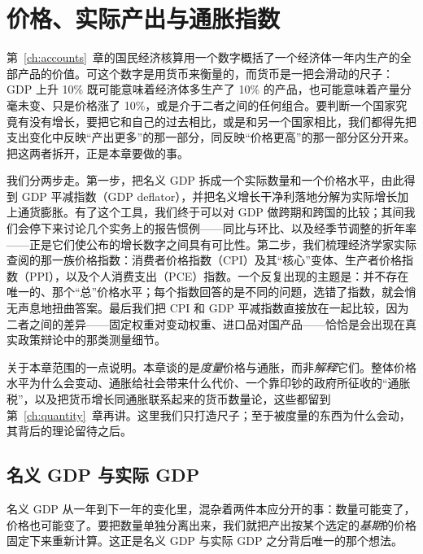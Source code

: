 \chapter{价格、实际产出与通胀指数}
\label{ch:prices}

第~\ref{ch:accounts}~章的国民经济核算用一个数字概括了一个经济体一年内生产的全部产品的价值。可这个数字是用货币来衡量的，而货币是一把会滑动的尺子：GDP 上升 10\% 既可能意味着经济体多生产了 10\% 的产品，也可能意味着产量分毫未变、只是价格涨了 10\%，或是介于二者之间的任何组合。要判断一个国家究竟有没有增长，要把它和自己的过去相比，或是和另一个国家相比，我们都得先把支出变化中反映“产出更多”的那一部分，同反映“价格更高”的那一部分区分开来。把这两者拆开，正是本章要做的事。

我们分两步走。第一步，把名义 GDP 拆成一个实际数量和一个价格水平，由此得到 GDP 平减指数（GDP deflator），并把名义增长干净利落地分解为实际增长加上通货膨胀。有了这个工具，我们终于可以对 GDP 做跨期和跨国的比较；其间我们会停下来讨论几个实务上的报告惯例——同比与环比、以及经季节调整的折年率——正是它们使公布的增长数字之间具有可比性。第二步，我们梳理经济学家实际查阅的那一族价格指数：消费者价格指数（CPI）及其“核心”变体、生产者价格指数（PPI），以及个人消费支出（PCE）指数。一个反复出现的主题是：并不存在唯一的、那个“总”价格水平；每个指数回答的是不同的问题，选错了指数，就会悄无声息地扭曲答案。最后我们把 CPI 和 GDP 平减指数直接放在一起比较，因为二者之间的差异——固定权重对变动权重、进口品对国产品——恰恰是会出现在真实政策辩论中的那类测量细节。

关于本章范围的一点说明。本章谈的是\emph{度量}价格与通胀，而非\emph{解释}它们。整体价格水平为什么会变动、通胀给社会带来什么代价、一个靠印钞的政府所征收的“通胀税”，以及把货币增长同通胀联系起来的货币数量论，这些都留到第~\ref{ch:quantity}~章再讲。这里我们只打造尺子；至于被度量的东西为什么会动，其背后的理论留待之后。

\section{名义 GDP 与实际 GDP}

名义 GDP 从一年到下一年的变化里，混杂着两件本应分开的事：数量可能变了，价格也可能变了。要把数量单独分离出来，我们就把产出按某个选定的\emph{基期}的价格固定下来重新计算。这正是名义 GDP 与实际 GDP 之分背后唯一的那个想法。


